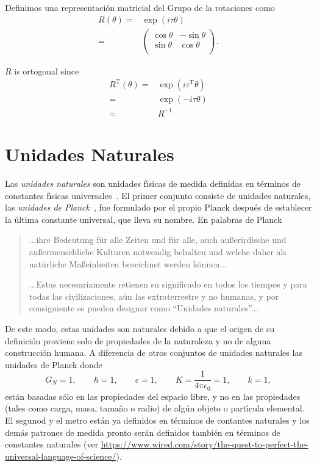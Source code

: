 Definimos una representación matricial del Grupo de la rotaciones como
\begin{align}
  R(\theta)=&\exp \left(i \tau \theta  \right) \nonumber\\
=&
\begin{pmatrix}
  \cos\theta & -\sin\theta \\
  \sin\theta & \cos\theta \\
\end{pmatrix}.
\end{align}

$R$ is ortogonal since
\begin{align}
  R^{\operatorname{T}}(\theta)=& \exp \left(i \tau^{\operatorname{T}} \theta  \right) \nonumber\\
        =& \exp \left(-i \tau \theta  \right) \nonumber\\
        =&R^{-1}
\end{align}



\section{Unidades Naturales}
\label{sec:NU}
Las \emph{unidades naturales} son unidades f\'\i sicas de medida definidas en t\'erminos de constantes f\'\i sicas universales~\cite{NU}. El primer conjunto consiste de unidades naturales, las \emph{unidades de Planck}~\cite{PU},  fue formulado por el propio Planck despu\'es de establecer la \'ultima constante universal, que lleva su nombre.  En palabras de Planck
\begin{quotation} %

  ...ihre Bedeutung f\"ur alle Zeiten und f\"ur alle, auch au\ss erirdische und au\ss ermenschliche Kulturen notwendig behalten und welche daher als \guillemotright nat\"urliche Ma\ss einheiten bezeichnet werden k\"onnen... %

...Estas necesariamente retienen su significado en todos los tiempos y para todas las civilizaciones, aún las extraterrestre y no humanas, y por consiguiente se pueden designar como ``Unidades naturales''...
\end{quotation} %
De este modo, estas unidades son naturales debido a que el origen de su definici\'on proviene solo de propiedades de la naturaleza y no de alguna construcci\'on humana. A diferencia de otros conjuntos de unidades naturales las unidades de Planck donde
\begin{equation}
\label{eq:144}
  G_N=1,\qquad \hbar=1,\qquad c=1,\qquad K=\frac{1}{4\pi\epsilon_0}=1,\qquad k=1,
\end{equation}
est\'an basadas s\'olo en las propiedades del espacio libre, y no en las propiedades (tales como carga, masa, tama\~no o radio) de alg\'un objeto o part\'\i cula elemental. El segunod y el metro están ya definidos en términos de contantes naturales y los demás patrones de medida pronto serán definidos también en términos de constantes naturales (ver \url{https://www.wired.com/story/the-quest-to-perfect-the-universal-language-of-science/}).

